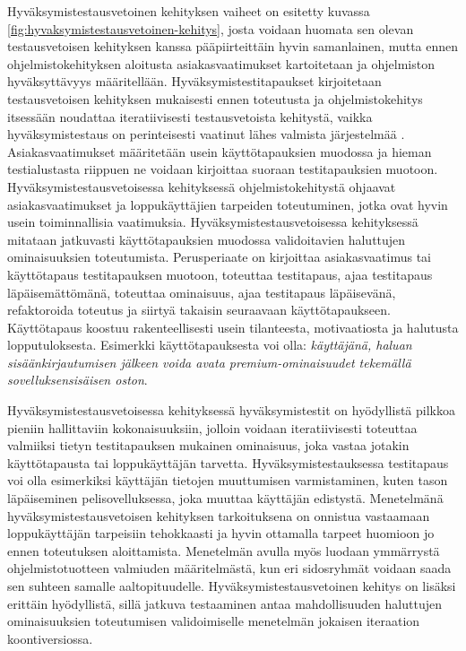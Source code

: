   Hyväksymistestausvetoinen kehityksen vaiheet on esitetty kuvassa \ref{fig:hyvaksymistestausvetoinen-kehitys}, josta voidaan huomata sen olevan testausvetoisen kehityksen kanssa pääpiirteittäin hyvin samanlainen, mutta ennen ohjelmistokehityksen aloitusta asiakasvaatimukset kartoitetaan ja ohjelmiston hyväksyttävyys määritellään.
  Hyväksymistestitapaukset kirjoitetaan testausvetoisen kehityksen mukaisesti ennen toteutusta ja ohjelmistokehitys itsessään noudattaa iteratiivisesti testausvetoista kehitystä, vaikka hyväksymistestaus on perinteisesti vaatinut lähes valmista järjestelmää \parencite{traditional_acceptance_testing}.
  Asiakasvaatimukset määritetään usein käyttötapauksien muodossa ja hieman testialustasta riippuen ne voidaan kirjoittaa suoraan testitapauksien muotoon.
  Hyväksymistestausvetoisessa kehityksessä ohjelmistokehitystä ohjaavat asiakasvaatimukset ja loppukäyttäjien tarpeiden toteutuminen, jotka ovat hyvin usein toiminnallisia vaatimuksia.
  Hyväksymistestausvetoisessa kehityksessä mitataan jatkuvasti käyttötapauksien muodossa validoitavien haluttujen ominaisuuksien toteutumista.
  Perusperiaate on kirjoittaa asiakasvaatimus tai käyttötapaus testitapauksen muotoon, toteuttaa testitapaus, ajaa testitapaus läpäisemättömänä, toteuttaa ominaisuus, ajaa testitapaus läpäisevänä, refaktoroida toteutus ja siirtyä takaisin seuraavaan käyttötapaukseen.
  Käyttötapaus koostuu rakenteellisesti usein tilanteesta, motivaatiosta ja halutusta lopputuloksesta.
  Esimerkki käyttötapauksesta voi olla: \emph{käyttäjänä, haluan sisäänkirjautumisen jälkeen voida avata premium-ominaisuudet tekemällä sovelluksensisäisen oston}.

  Hyväksymistestausvetoisessa kehityksessä hyväksymistestit on hyödyllistä pilkkoa pieniin hallittaviin kokonaisuuksiin, jolloin voidaan iteratiivisesti toteuttaa valmiiksi tietyn testitapauksen mukainen ominaisuus, joka vastaa jotakin käyttötapausta tai loppukäyttäjän tarvetta.
  Hyväksymistestauksessa testitapaus voi olla esimerkiksi käyttäjän tietojen muuttumisen varmistaminen, kuten tason läpäiseminen pelisovelluksessa, joka muuttaa käyttäjän edistystä.
  Menetelmänä hyväksymistestausvetoisen kehityksen tarkoituksena on onnistua vastaamaan loppukäyttäjän tarpeisiin tehokkaasti ja hyvin ottamalla tarpeet huomioon jo ennen toteutuksen aloittamista.
  Menetelmän avulla myös luodaan ymmärrystä ohjelmistotuotteen valmiuden määritelmästä, kun eri sidosryhmät voidaan saada sen suhteen samalle aaltopituudelle.
  Hyväksymistestausvetoinen kehitys on lisäksi erittäin hyödyllistä, sillä jatkuva testaaminen antaa mahdollisuuden haluttujen ominaisuuksien toteutumisen validoimiselle menetelmän jokaisen iteraation koontiversiossa.


